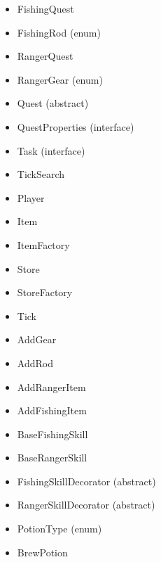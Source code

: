 \documentclass[letter paper, 12pt]{article}
\begin{document}
\begin{multicols}{2}
\begin{itemize}
	\item FishingQuest
	\item FishingRod (enum)
	\item RangerQuest
	\item RangerGear (enum)
	\item Quest (abstract)
	\item QuestProperties (interface)
	\item Task (interface)
	\item TickSearch
	\item Player
	\item Item
	\item ItemFactory
	\item Store
	\item StoreFactory
	\item Tick
	\item AddGear
	\item AddRod
	\item AddRangerItem
	\item AddFishingItem
	\item BaseFishingSkill
	\item BaseRangerSkill
	\item FishingSkillDecorator (abstract)
	\item RangerSkillDecorator (abstract)
	\item PotionType (enum)
	\item BrewPotion
\end{itemize}
\end{multicols}
\end{document}
